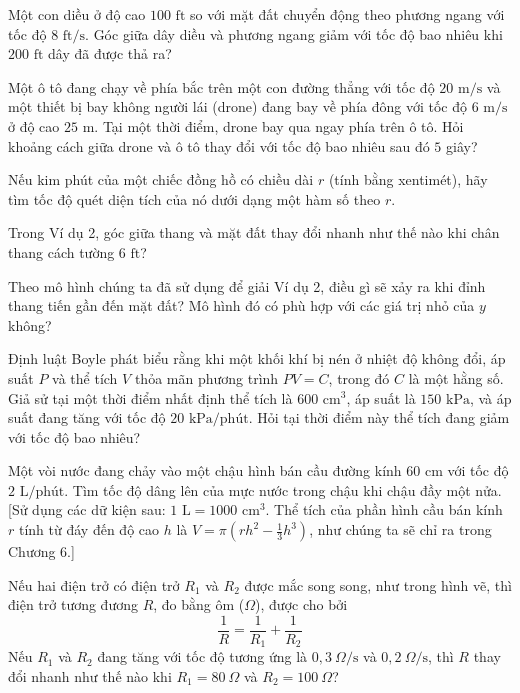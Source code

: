 \noindent
\begin{minipage}[t]{0.48\textwidth}
\begin{exerciselist}[start=32]
  \item Một con diều ở độ cao $100\text{ ft}$ so với mặt đất chuyển động theo phương ngang với tốc độ $8\text{ ft/s}$. Góc giữa dây diều và phương ngang giảm với tốc độ bao nhiêu khi $200\text{ ft}$ dây đã được thả ra?

  \item Một ô tô đang chạy về phía bắc trên một con đường thẳng với tốc độ $20\text{ m/s}$ và một thiết bị bay không người lái (drone) đang bay về phía đông với tốc độ $6\text{ m/s}$ ở độ cao $25\text{ m}$. Tại một thời điểm, drone bay qua ngay phía trên ô tô. Hỏi khoảng cách giữa drone và ô tô thay đổi với tốc độ bao nhiêu sau đó $5$ giây?

  \item Nếu kim phút của một chiếc đồng hồ có chiều dài $r$ (tính bằng xentimét), hãy tìm tốc độ quét diện tích của nó dưới dạng một hàm số theo $r$.

  \item Trong Ví dụ 2, góc giữa thang và mặt đất thay đổi nhanh như thế nào khi chân thang cách tường $6\text{ ft}$?

  \item Theo mô hình chúng ta đã sử dụng để giải Ví dụ 2, điều gì sẽ xảy ra khi đỉnh thang tiến gần đến mặt đất? Mô hình đó có phù hợp với các giá trị nhỏ của $y$ không?

  \item Định luật Boyle phát biểu rằng khi một khối khí bị nén ở nhiệt độ không đổi, áp suất $P$ và thể tích $V$ thỏa mãn phương trình $PV = C$, trong đó $C$ là một hằng số. Giả sử tại một thời điểm nhất định thể tích là $600\text{ cm}^3$, áp suất là $150\text{ kPa}$, và áp suất đang tăng với tốc độ $20\text{ kPa/phút}$. Hỏi tại thời điểm này thể tích đang giảm với tốc độ bao nhiêu?

  \item[\llap{\casicon\hspace{4pt}}\textbf{38.}] Một vòi nước đang chảy vào một chậu hình bán cầu đường kính $60\text{ cm}$ với tốc độ $2\text{ L/phút}$. Tìm tốc độ dâng lên của mực nước trong chậu khi chậu đầy một nửa. [Sử dụng các dữ kiện sau: $1\text{ L} = 1000\text{ cm}^3$. Thể tích của phần hình cầu bán kính $r$ tính từ đáy đến độ cao $h$ là $V = \pi (rh^2 - \frac{1}{3}h^3)$, như chúng ta sẽ chỉ ra trong Chương 6.]

  \item Nếu hai điện trở có điện trở $R_1$ và $R_2$ được mắc song song, như trong hình vẽ, thì điện trở tương đương $R$, đo bằng ôm ($\Omega$), được cho bởi
  \[
    \frac{1}{R} = \frac{1}{R_1} + \frac{1}{R_2}
  \]
  Nếu $R_1$ và $R_2$ đang tăng với tốc độ tương ứng là $0{,}3\ \Omega/\text{s}$ và $0{,}2\ \Omega/\text{s}$, thì $R$ thay đổi nhanh như thế nào khi $R_1 = 80\ \Omega$ và $R_2 = 100\ \Omega$?


\end{exerciselist}
\end{minipage}
